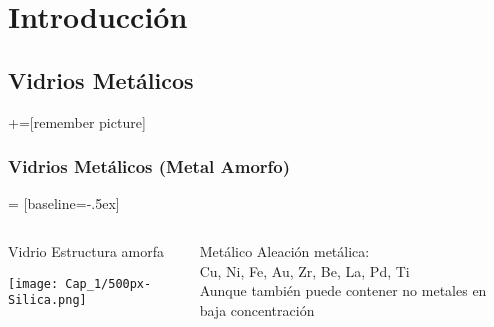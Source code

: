 
\section[Introducci\'on]{Introducci\'on}
\subsection{Vidrios Met\'alicos}

+=[remember picture]

\begin{frame}
\frametitle{Vidrios Met\'alicos (Metal Amorfo)}

 = [baseline=-.5ex]

\centering
{} 

\vspace{0.2cm}

\begin{columns}
  \begin{column}{0.48\paperwidth}
    \centering
    \begin{block}{Vidrio}
      \centering Estructura amorfa
      
      \vspace{0.2cm}
      \texttt{[image: Cap\_1/500px-Silica.png]}
    \end{block}
  \end{column}
  \begin{column}{0.48\paperwidth}
    \centering
    \begin{block}{Met\'alico}
      \centering Aleaci\'on met\'alica:\\
      Cu, Ni, Fe, Au, Zr, Be, La, Pd, Ti\\
      
      \vspace{0.2cm}
      Aunque tambi\'en puede contener no metales en baja concentraci\'on
    \end{block}
  \end{column}
\end{columns}


\end{frame}

